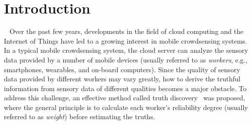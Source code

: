 \documentclass[conference]{IEEEtran}
\begin{document}
\section{Introduction}~\label{sec1}
Over the past few years, developments in the field of cloud computing and the Internet of Things have led to a growing interest in mobile crowdsensing systems.
In a typical mobile crowdsensing system, the cloud server can analyze the sensory data provided by a number of mobile devices (usually referred to as {\em workers}, e.g., smartphones, wearables, and on-board computers).
Since the quality of sensory data provided by different workers may vary greatly, how to derive the truthful information from sensory data of different qualities becomes a major obstacle.
To address this challenge, an effective method called truth discovery~\cite{li_resolving_2014,li_confidence-aware_2014,li_conflicts_2016} was proposed, where the general principle is to calculate each worker's reliability degree (usually referred to as {\em weight}) before estimating the truths.
\end{document}
